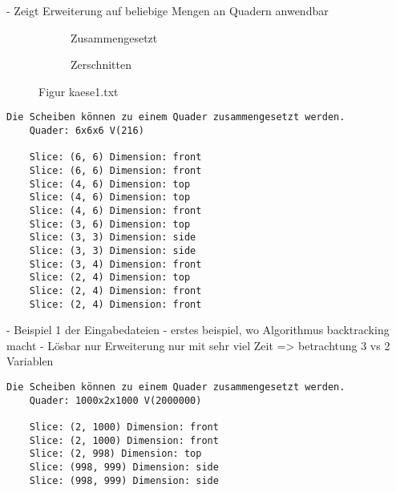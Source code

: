 \documentclass[a4paper,10pt,ngerman]{scrartcl}
\newcommand{\simplecube}[8]%
{
    \begin{scope}[shift={#1}]
        \fill[gray!40,canvas is yz plane at x=#2, opacity=#8] (0,0) rectangle (#3,#4);
        \fill[gray!10,canvas is xz plane at y=#3, opacity=#8] (0,0) rectangle (#2,#4);
        \fill[white  ,canvas is xy plane at z=#4, opacity=#8] (0,0) rectangle (#2,#3);
        \foreach\i/\j in {0/1, 1/1, 1/0}
            {
            \draw[line#5] (0,#3*\i,#4*\j) --++ (#2,0,0);
            \draw[line#6] (#2*\i,0,#4*\j) --++ (0,#3,0);
            \draw[line#7] (#2*\i,#3*\j,0) --++ (0,0,#4);
        }
    \end{scope}
}
\newcommand{\bigSquare}[4]%
{
    \begin{scope}[shift={#1}]
        \simplecube{(0,     0,      0)}     {1}{4}{2}   {a}{a}{a}   {1}
        \simplecube{(1+#4,   0,      0))}    {1}{4}{2}   {a}{a}{a}   {1}
        \simplecube{(0,     0,      2+#4)}   {2}{4}{1}   {a}{a}{a}   {1}
        \simplecube{(2+2*#4,   0,      0)}     {1}{4}{3}   {a}{a}{a}   {0.8}
        \simplecube{(0,     4+#4,    0)}     {3}{1}{3}   {a}{a}{a}   {0.8}
        \simplecube{(0,     5+2*#4,    0)}     {3}{1}{3}   {a}{a}{a}   {0.5}
        \simplecube{(0,     0,      3+2*#4)}   {3}{6}{1}   {a}{a}{a}   {0.8}
        \simplecube{(3+3*#4,   0,      0))}    {1}{6}{4}   {a}{a}{a}   {0.5}
        \simplecube{(0,     0,      4+3*#4)}   {4}{6}{1}   {a}{a}{a}   {0.5}
        \simplecube{(0,     0,      5+4*#4)}   {4}{6}{1}   {a}{a}{a}   {0.2}
        \simplecube{(4+4*#4,   0,      0))}    {1}{6}{6}   {a}{a}{a}   {0.2}
        \simplecube{(5+5*#4,   0,      0))}    {1}{6}{6}   {a}{a}{a}   {0}
    \end{scope}
}
\begin{document}
    - Zeigt Erweiterung auf beliebige Mengen an Quadern anwendbar

    \newpage

    \begin{figure}[H]
        \centering
        \def\a{3.2}
        \def\b{1.2}
        \begin{subfigure}[b]{0.45\textwidth}
            \centering %
            \caption{Zusammengesetzt}\label{fig:figA1}
        \end{subfigure}
        \begin{subfigure}[b]{0.45\textwidth}
            \centering %
            \caption{Zerschnitten}\label{fig:figB1}
        \end{subfigure}
        \caption{Figur kaese1.txt}\label{fig:figAB1}
    \end{figure}

    \begin{lstlisting}[frame=single, title=Programmausgabe kaese1.txt, breaklines=true,label={lst:lstlisting6}]
    Die Scheiben können zu einem Quader zusammengesetzt werden.
    Quader: 6x6x6 V(216)

    Slice: (6, 6) Dimension: front
    Slice: (6, 6) Dimension: front
    Slice: (4, 6) Dimension: top
    Slice: (4, 6) Dimension: top
    Slice: (4, 6) Dimension: front
    Slice: (3, 6) Dimension: top
    Slice: (3, 3) Dimension: side
    Slice: (3, 3) Dimension: side
    Slice: (3, 4) Dimension: front
    Slice: (2, 4) Dimension: top
    Slice: (2, 4) Dimension: front
    Slice: (2, 4) Dimension: front
    \end{lstlisting}

    - Beispiel 1 der Eingabedateien
    - erstes beispiel, wo Algorithmus backtracking macht
    - Lösbar nur Erweiterung nur mit sehr viel Zeit
    => betrachtung 3 vs 2 Variablen

    \begin{lstlisting}[frame=single, title=Programmausgabe kaese2.txt, breaklines=true,label={lst:lstlisting7}]
    Die Scheiben können zu einem Quader zusammengesetzt werden.
    Quader: 1000x2x1000 V(2000000)

    Slice: (2, 1000) Dimension: front
    Slice: (2, 1000) Dimension: front
    Slice: (2, 998) Dimension: top
    Slice: (998, 999) Dimension: side
    Slice: (998, 999) Dimension: side
    \end{lstlisting}
\end{document}
